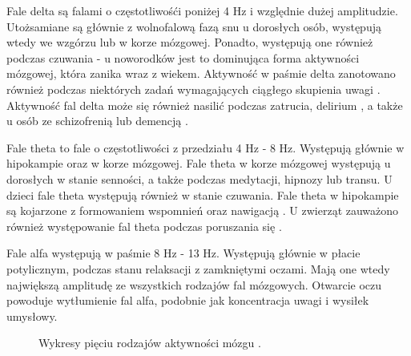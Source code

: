 \documentclass[notitlepage]{report}
\begin{document}
Fale delta są falami o częstotliwośći poniżej 4 Hz i względnie dużej amplitudzie. Utożsamiane są głównie z wolnofalową fazą snu u dorosłych osób, występują wtedy we wzgórzu lub w korze mózgowej. Ponadto, występują one również podczas czuwania - u noworodków jest to dominująca forma aktywności mózgowej, która zanika wraz z wiekem. Aktywność w paśmie delta zanotowano również podczas niektórych zadań wymagających ciągłego skupienia uwagi \cite{harmony}. Aktywność fal delta może się również nasilić podczas zatrucia, delirium \cite{jacobson}, a także u osób ze schizofrenią lub demencją \cite{rockstroh}.

Fale theta to fale o częstotliwości z przedziału 4 Hz - 8 Hz. Występują głównie w hipokampie oraz w korze mózgowej. Fale theta w korze mózgowej występują u dorosłych w stanie senności, a także podczas medytacji, hipnozy lub transu. U dzieci fale theta występują również w stanie czuwania. Fale theta w hipokampie są kojarzone z formowaniem wspomnień \cite{lega} oraz nawigacją \cite{ekstrom}. U zwierząt zauważono również występowanie fal theta podczas poruszania się \cite{vanderwolf}.

Fale alfa występują w paśmie 8 Hz - 13 Hz. Występują głównie w płacie potylicznym, podczas stanu relaksacji z zamkniętymi oczami. Mają one wtedy największą amplitudę ze wszystkich rodzajów fal mózgowych. Otwarcie oczu powoduje wytłumienie fal alfa, podobnie jak koncentracja uwagi i wysiłek umysłowy.

\begin{figure}[H]
	\centering
	\caption{Wykresy pięciu rodzajów aktywności mózgu \cite{campisi}.}
\end{figure}
\end{document}
